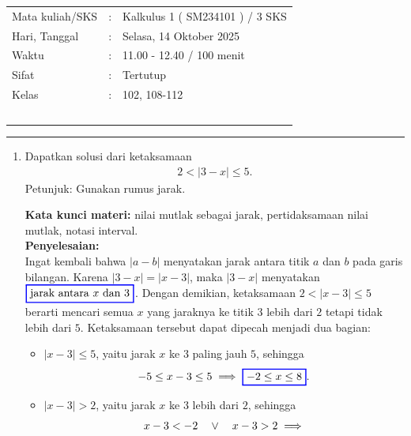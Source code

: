 \documentclass[10pt,openany,a4paper]{article}
\theoremstyle{definition}
\theoremstyle{definition}
\theoremstyle{plain}
\newenvironment{jawab}[2][tes]{%
\par\noindent\textbf{Kata kunci materi:} #1.\\
\textbf{Penyelesaian:} #2%
}{}
\begin{document}
    \begin{center}
	\begin{tabular}{lcl}
		Mata kuliah/SKS & : & Kalkulus 1 ( SM234101 ) / 3 SKS\\
		Hari, Tanggal & : & Selasa, 14 Oktober 2025\\
		Waktu & : & 11.00 - 12.40 / 100 menit\\
		Sifat & : & Tertutup\\
		Kelas & : & 102, 108-112\\
  ~
	\end{tabular}

    \noindent\rule{\textwidth}{2.pt}
        \end{center}
        \begin{enumerate}
            \item Dapatkan solusi dari ketaksamaan
            \begin{align*}
                2<|3-x|\leq 5.
            \end{align*}
            Petunjuk: Gunakan rumus jarak.
            \begin{jawab}[nilai mutlak sebagai jarak, pertidaksamaan nilai mutlak, notasi interval]{~\\
                Ingat kembali bahwa $|a-b|$ menyatakan jarak antara titik $a$ dan $b$ pada garis bilangan. Karena $|3-x|=|x-3|$, maka $|3-x|$ menyatakan $\colorlet{oldcolor}{.}
        \color{blue}
        \setlength{\fboxrule}{1pt} \boxed{\color{oldcolor}\text{jarak antara } x \text{ dan } 3}\color{oldcolor}$. Dengan demikian, ketaksamaan $2<|x-3|\leq 5$ berarti mencari semua $x$ yang jaraknya ke titik $3$ lebih dari $2$ tetapi tidak lebih dari $5$. Ketaksamaan tersebut dapat dipecah menjadi dua bagian:
                \begin{itemize}
                    \item $|x-3|\leq 5$, yaitu jarak $x$ ke $3$ paling jauh $5$, sehingga
                    \begin{align*}
                        -5\leq x-3\leq 5 \implies \colorlet{oldcolor}{.}
        \color{blue}
        \setlength{\fboxrule}{1pt} \boxed{\color{oldcolor}-2\leq x\leq 8}\color{oldcolor}.
                    \end{align*}
                    \item $|x-3|>2$, yaitu jarak $x$ ke $3$ lebih dari $2$, sehingga
                    \begin{align*}
                        x-3<-2 \quad\vee\quad x-3>2 \implies \colorlet{oldcolor}{.}
        \color{blue}

\end{align*}
\end{itemize}}
\end{jawab}
\end{enumerate}
\end{document}
